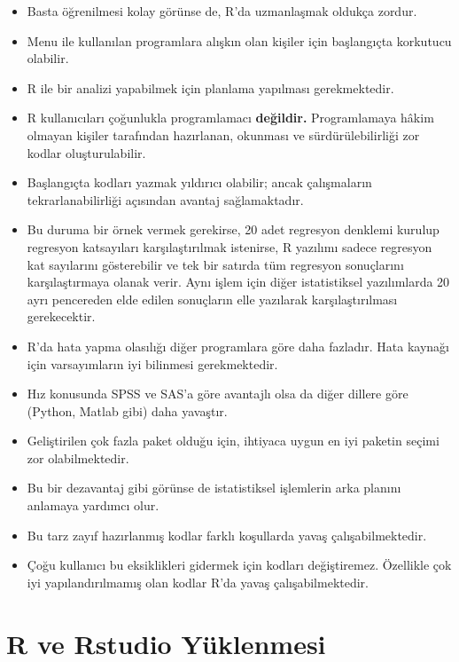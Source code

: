 \documentclass[
  oneside]{book}
\begin{document}
\begin{itemize}
\item
  Basta öğrenilmesi kolay görünse de, R'da uzmanlaşmak oldukça zordur.
\item
  Menu ile kullanılan programlara alışkın olan kişiler için başlangıçta korkutucu olabilir.
\item
  R ile bir analizi yapabilmek için planlama yapılması gerekmektedir.
\item
  R kullanıcıları çoğunlukla programlamacı \textbf{değildir.} Programlamaya hâkim olmayan kişiler tarafından hazırlanan, okunması ve sürdürülebilirliği zor kodlar oluşturulabilir.
\item
  Başlangıçta kodları yazmak yıldırıcı olabilir; ancak çalışmaların tekrarlanabilirliği açısından avantaj sağlamaktadır.
\item
  Bu duruma bir örnek vermek gerekirse, 20 adet regresyon denklemi kurulup regresyon katsayıları karşılaştırılmak istenirse, R yazılımı sadece regresyon kat sayılarını gösterebilir ve tek bir satırda tüm regresyon sonuçlarını karşılaştırmaya olanak verir. Aynı işlem için diğer istatistiksel yazılımlarda 20 ayrı pencereden elde edilen sonuçların elle yazılarak karşılaştırılması gerekecektir.
\item
  R'da hata yapma olasılığı diğer programlara göre daha fazladır. Hata kaynağı için varsayımların iyi bilinmesi gerekmektedir.
\item
  Hız konusunda SPSS ve SAS'a göre avantajlı olsa da diğer dillere göre (Python, Matlab gibi) daha yavaştır.
\item
  Geliştirilen çok fazla paket olduğu için, ihtiyaca uygun en iyi paketin seçimi zor olabilmektedir.
\item
  Bu bir dezavantaj gibi görünse de istatistiksel işlemlerin arka planını anlamaya yardımcı olur.
\item
  Bu tarz zayıf hazırlanmış kodlar farklı koşullarda yavaş çalışabilmektedir.
\item
  Çoğu kullanıcı bu eksiklikleri gidermek için kodları değiştiremez. Özellikle çok iyi yapılandırılmamış olan kodlar R'da yavaş çalışabilmektedir.
\end{itemize}

\hypertarget{r-ve-rstudio-yuxfcklenmesi}{%
\section{R ve Rstudio Yüklenmesi}\label{r-ve-rstudio-yuxfcklenmesi}}
\end{document}
